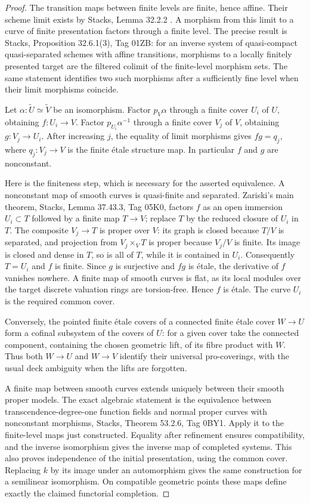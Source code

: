 \begin{proof}
The transition maps between finite levels are finite, hence affine.
Their scheme limit exists by Stacks, Lemma 32.2.2
\cite[Tag 01YV]{D_Stacks}.  A morphism from this limit to a curve of
finite presentation factors through a finite level.  The precise result
is Stacks, Proposition 32.6.1(3), Tag 01ZB: for an inverse system of
quasi-compact quasi-separated schemes with affine transitions, morphisms
to a locally finitely presented target are the filtered colimit of the
finite-level morphism sets.  The same statement identifies two such
morphisms after a sufficiently fine level when their limit morphisms
coincide.

Let $\alpha:\widetilde U\simeq\widetilde V$ be an isomorphism.  Factor
$p_V\alpha$ through a finite cover $U_i$ of $U$, obtaining $f:U_i\to V$.
Factor $p_{U_i}\alpha^{-1}$ through a finite cover $V_j$ of $V$, obtaining
$g:V_j\to U_i$.  After increasing $j$, the equality of limit morphisms
gives $fg=q_j$, where $q_j:V_j\to V$ is the finite \'etale structure
map.  In particular $f$ and $g$ are nonconstant.

Here is the finiteness step, which is necessary for the asserted
equivalence.  A nonconstant map of smooth curves is quasi-finite and
separated.  Zariski's main theorem, Stacks, Lemma 37.43.3, Tag 05K0,
factors $f$ as an open immersion $U_i\subset T$ followed by a finite map
$T\to V$; replace $T$ by the reduced closure of $U_i$ in $T$.
The composite $V_j\to T$ is proper over $V$: its graph is closed because
$T/V$ is separated, and projection from $V_j\times_V T$ is proper
because $V_j/V$ is finite.  Its image is closed and dense in $T$, so is
all of $T$, while it is contained in $U_i$.  Consequently $T=U_i$ and
$f$ is finite.  Since $g$ is surjective and $fg$ is \'etale, the
derivative of $f$ vanishes nowhere.  A finite map of smooth curves is
flat, as its local modules over the target discrete valuation rings
are torsion-free.  Hence $f$ is \'etale.  The curve $U_i$ is the required
common cover.

Conversely, the pointed finite \'etale covers of a connected finite
\'etale cover $W\to U$ form a cofinal subsystem of the covers of $U$:
for a given cover take the connected component, containing the chosen
geometric lift, of its fibre product with $W$.  Thus both $W\to U$ and
$W\to V$ identify their universal pro-coverings, with the usual deck
ambiguity when the lifts are forgotten.

A finite map between smooth curves extends uniquely between their
smooth proper models.  The exact algebraic statement is the equivalence
between transcendence-degree-one function fields and normal proper
curves with nonconstant morphisms, Stacks, Theorem 53.2.6, Tag 0BY1.
Apply it to the finite-level maps just constructed.  Equality after
refinement ensures compatibility, and the inverse isomorphism gives the
inverse map of completed systems.  This also proves independence of the
initial presentation, using the common cover.  Replacing $k$ by its
image under an automorphism gives the same construction for a semilinear
isomorphism.  On compatible geometric points these maps define exactly
the claimed functorial completion.
\end{proof}

